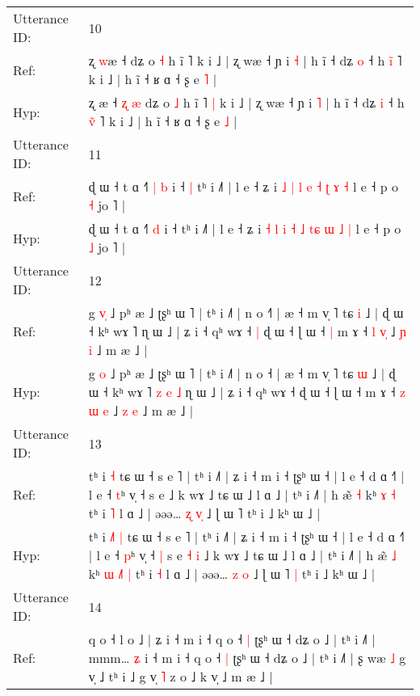 \documentclass[10pt]{article}
\DeclareRobustCommand{\hl}[1]{{\textcolor{red}{#1}}}
\begin{document}
\begin{longtable}{ll}
\midrule
Utterance ID: & 10 \\
Ref: & ʐ \hl{w}æ ˧\hl{}\hl{}\hl{}\hl{} dʑ o \hl{˧} h ĩ ˥\hl{}\hl{} k i ˩ | ʐ wæ ˧ ɲ i \hl{˧} | h ĩ ˧ dʑ \hl{o} ˧ h \hl{i}̃ ˥ k i ˩ | h ĩ ˧ ʁ ɑ ˧ ʂ e \hl{˥} |
 \\
Hyp: & ʐ \hl{}æ ˧\hl{ }\hl{ʐ}\hl{ }\hl{æ} dʑ o \hl{˩} h ĩ ˥\hl{ }\hl{|} k i ˩ | ʐ wæ ˧ ɲ i \hl{˥} | h ĩ ˧ dʑ \hl{i} ˧ h \hl{v}̃ ˥ k i ˩ | h ĩ ˧ ʁ ɑ ˧ ʂ e \hl{˩} |
 \\
\midrule
Utterance ID: & 11 \\
Ref: & ɖ ɯ ˧ t ɑ ˧˥\hl{ }\hl{|} \hl{b} i ˧\hl{ }\hl{|} tʰ i ˩˥ | l e ˧ ʑ i\hl{}\hl{} \hl{˩} \hl{|} \hl{l} \hl{e} \hl{}\hl{˧} \hl{ʈ} \hl{ɤ} \hl{˧} l e ˧ p o \hl{˧} jo ˥ |
 \\
Hyp: & ɖ ɯ ˧ t ɑ ˧˥\hl{}\hl{} \hl{d} i ˧\hl{}\hl{} tʰ i ˩˥ | l e ˧ ʑ i\hl{ }\hl{˧} \hl{l} \hl{i} \hl{˧} \hl{˩} \hl{t}\hl{ɕ} \hl{ɯ} \hl{˩} \hl{|} l e ˧ p o \hl{˩} jo ˥ |
 \\
\midrule
Utterance ID: & 12 \\
Ref: & g \hl{v}\hl{̩} ˩ pʰ æ ˩ ʈʂʰ ɯ ˥ | tʰ i ˩˥ | n o ˧\hl{˥} | æ ˧ m v̩ ˥ tɕ \hl{i} ˩ | ɖ ɯ ˧ kʰ wɤ ˥\hl{}\hl{}\hl{}\hl{}\hl{}\hl{} ɳ ɯ ˩ | ʑ i ˧ qʰ wɤ ˧\hl{ }\hl{|} ɖ ɯ ˧ ɭ ɯ ˧\hl{ }\hl{|} m ɤ ˧ \hl{l} \hl{}\hl{v}\hl{̩} ˩ \hl{ɲ} \hl{i} ˩ m æ ˩ |
 \\
Hyp: & g \hl{}\hl{o} ˩ pʰ æ ˩ ʈʂʰ ɯ ˥ | tʰ i ˩˥ | n o ˧\hl{} | æ ˧ m v̩ ˥ tɕ \hl{ɯ} ˩ | ɖ ɯ ˧ kʰ wɤ ˥\hl{ }\hl{z}\hl{ }\hl{e}\hl{ }\hl{˩} ɳ ɯ ˩ | ʑ i ˧ qʰ wɤ ˧\hl{}\hl{} ɖ ɯ ˧ ɭ ɯ ˧\hl{}\hl{} m ɤ ˧ \hl{z} \hl{ɯ}\hl{ }\hl{e} ˩ \hl{z} \hl{e} ˩ m æ ˩ |
 \\
\midrule
Utterance ID: & 13 \\
Ref: & tʰ i\hl{}\hl{}\hl{} \hl{˧} tɕ ɯ ˧ s e ˥ | tʰ i ˩˥ | ʑ i ˧ m i ˧ ʈʂʰ ɯ ˧ | l e ˧ d ɑ ˧˥ | l e ˧ \hl{t}ʰ v̩ ˧\hl{}\hl{} s e\hl{}\hl{}\hl{}\hl{} ˩ k wɤ ˩ tɕ ɯ ˩ l ɑ ˩ | tʰ i ˩˥ | h æ̃ \hl{˧} kʰ\hl{}\hl{} \hl{}\hl{ɤ} \hl{˧} tʰ i \hl{˥} l ɑ ˩ | əəə… \hl{ʐ} \hl{v}\hl{̩} ˩ ɭ ɯ ˥\hl{}\hl{} tʰ i ˩ kʰ ɯ ˩ |
 \\
Hyp: & tʰ i\hl{ }\hl{˩}\hl{˥} \hl{|} tɕ ɯ ˧ s e ˥ | tʰ i ˩˥ | ʑ i ˧ m i ˧ ʈʂʰ ɯ ˧ | l e ˧ d ɑ ˧˥ | l e ˧ \hl{p}ʰ v̩ ˧\hl{ }\hl{|} s e\hl{ }\hl{˧}\hl{ }\hl{i} ˩ k wɤ ˩ tɕ ɯ ˩ l ɑ ˩ | tʰ i ˩˥ | h æ̃ \hl{˩} kʰ\hl{ }\hl{ɯ} \hl{˩}\hl{˥} \hl{|} tʰ i \hl{˧} l ɑ ˩ | əəə… \hl{z} \hl{}\hl{o} ˩ ɭ ɯ ˥\hl{ }\hl{|} tʰ i ˩ kʰ ɯ ˩ |
 \\
\midrule
Utterance ID: & 14 \\
Ref: & q o ˧ l o ˩ | ʑ i ˧ m i ˧ q o ˧\hl{ }\hl{|} ʈʂʰ ɯ ˧ dʑ o ˩ | tʰ i ˩˥ | mmm…\hl{}\hl{} \hl{}\hl{ʑ} i ˧ m i ˧ q o ˧\hl{ }\hl{|} ʈʂʰ ɯ ˧ dʑ o ˩ | tʰ i ˩˥ | ʂ wæ \hl{˩} g v̩ ˩\hl{}\hl{} tʰ i ˩ g v̩\hl{ }\hl{˥} z o ˩ k v̩ ˩ m æ ˩ |

\end{longtable}
\end{document}
